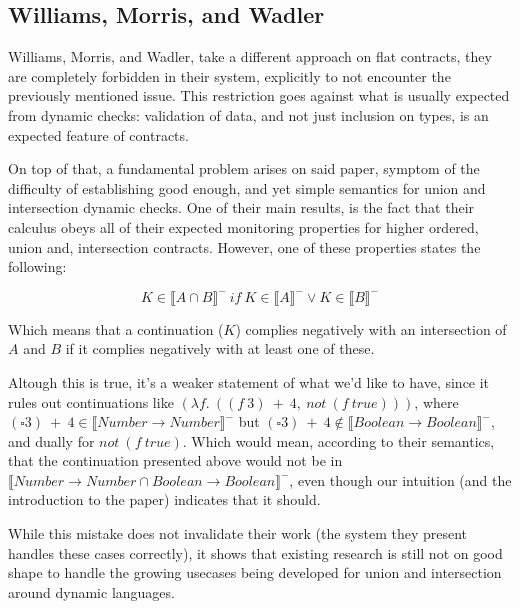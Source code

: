 \documentclass[sigplan,10pt,review,anonymous]{acmart}
\newcommand{\unsure}[2][1=]{}
\begin{document}
\subsection*{Williams, Morris, and Wadler}
\label{sec:will-morr-wadl}
\unsure{Subsection title?}

Williams, Morris, and Wadler, take a different approach on flat contracts,
they are completely forbidden in their system, explicitly to not encounter
the previously mentioned issue.
This restriction goes against what is usually expected from dynamic checks:
validation of data, and not just inclusion on types, is an expected
feature of contracts.

On top of that, a fundamental problem arises on said paper,
symptom of the difficulty of establishing good enough, and yet
simple semantics for union and intersection dynamic checks.
One of their main results, is the fact that their calculus obeys
all of their expected monitoring properties for higher ordered, union
and, intersection contracts.
However, one of these properties states the following:

$$ K \in \llbracket A \cap B \rrbracket^-~if~K \in \llbracket A \rrbracket^- \lor K \in \llbracket B \rrbracket^- $$

Which means that a continuation ($K$) complies negatively with an
intersection of $A$ and $B$ if it complies negatively with at least one of these.

Altough this is true, it's a weaker statement of what we'd like to have,
since it rules out continuations like $(\lambda f.~((f~3)~+~4,~not~(f ~ true)))$,
where $(\square 3)~+~4 \in \llbracket Number \rightarrow Number \rrbracket^-$
but $(\square 3)~+~4 \not \in \llbracket Boolean \rightarrow Boolean \rrbracket^-$,
and dually for $not~(f ~ true)$.
Which would mean, according to their semantics, that
the continuation presented above would not
be in $\llbracket Number \rightarrow Number \cap Boolean \rightarrow Boolean \rrbracket^-$,
even though our intuition (and the
introduction to the paper) indicates that it should.


While this mistake does not invalidate their work (the system they present
handles these cases correctly), it shows that existing research is still not on
good shape to handle the growing usecases being developed for
union and intersection around dynamic languages.
\end{document}
